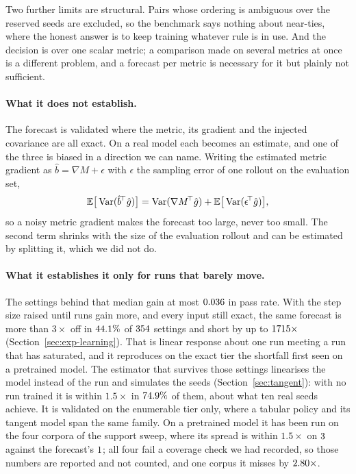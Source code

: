 Two further limits are structural. Pairs whose ordering is ambiguous over the reserved seeds are
excluded, so the benchmark says nothing about near-ties, where the honest answer is to keep
training whatever rule is in use. And the decision is over one scalar metric; a comparison made on
several metrics at once is a different problem, and a forecast per metric is necessary for it but
plainly not sufficient.

\paragraph{What it does not establish.} The forecast is validated where the metric, its gradient
and the injected covariance are all exact. On a real model each becomes an estimate, and one of the
three is biased in a direction we can name. Writing the estimated metric gradient as
$\hat{b} = \nabla M + \epsilon$ with $\epsilon$ the sampling error of one rollout on the evaluation
set,
\begin{equation}
  \label{eq:bias}
  \mathbb{E}\big[\operatorname{Var}(\hat{b}^{\!\top}\hat{g})\big]
  = \operatorname{Var}(\nabla M^{\!\top}\hat{g}) + \mathbb{E}\big[\operatorname{Var}(\epsilon^{\!\top}\hat{g})\big],
\end{equation}
so a noisy metric gradient makes the forecast too large, never too small. The second term shrinks
with the size of the evaluation rollout and can be estimated by splitting it, which we did not do.

\paragraph{What it establishes it only for runs that barely move.} The settings behind that
median gain at most $0.036$ in pass rate. With the step size raised until runs gain
more, and every input still exact, the same forecast is more than $3\times$ off in
$44.1\%$ of $354$ settings and short by up to
$1715\times$ (Section~\ref{sec:exp-learning}). That is linear response about
one run meeting a run that has saturated, and it reproduces on the exact tier the shortfall first
seen on a pretrained model. The estimator that survives those settings linearises the model
instead of the run and simulates the seeds (Section~\ref{sec:tangent}): with no run trained it is
within $1.5\times$ in $74.9\%$ of them, about what ten real seeds achieve. It
is validated on the enumerable tier only, where a tabular policy and its tangent model span the
same family. On a pretrained model it has been run on the four corpora of the support sweep,
where its spread is within $1.5\times$ on $3$ against the forecast's
$1$; all four fail a coverage check we had recorded, so those numbers are
reported and not counted, and one corpus it misses by $2.80\times$.

